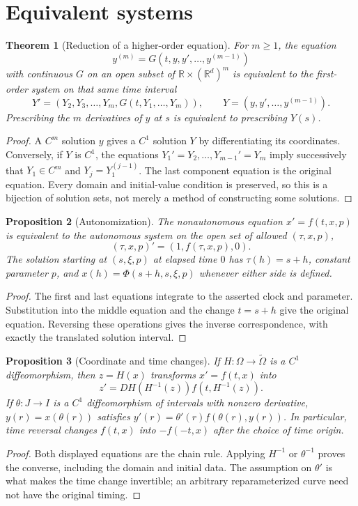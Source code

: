 \documentclass[11pt,oneside]{book}
\newtheorem{theorem}{Theorem}[chapter]
\newtheorem{proposition}[theorem]{Proposition}
\theoremstyle{definition}
\theoremstyle{remark}\newtheorem{remark}[theorem]{Remark}
\newcommand{\R}{\mathbb R}\newcommand{\C}{\mathbb C}
\begin{document}
\section{Equivalent systems}
\begin{theorem}[Reduction of a higher-order equation]\label{d13:01:higher-order}
For $m\geq1$, the equation
\[
 y^{(m)}=G(t,y,y',\ldots,y^{(m-1)})
\]
with continuous $G$ on an open subset of $\R\times(\R^d)^m$ is equivalent
to the first-order system on that same time interval
\[
 Y'=(Y_2,Y_3,\ldots,Y_m,G(t,Y_1,\ldots,Y_m)),
 \qquad Y=(y,y',\ldots,y^{(m-1)}).
\]
Prescribing the $m$ derivatives of $y$ at $s$ is equivalent to prescribing
$Y(s)$.
\end{theorem}
\begin{proof}
A $C^m$ solution $y$ gives a $C^1$ solution $Y$ by differentiating its
coordinates. Conversely, if $Y$ is $C^1$, the equations
$Y_1'=Y_2,\ldots,Y_{m-1}'=Y_m$ imply successively that
$Y_1\in C^m$ and $Y_j=Y_1^{(j-1)}$. The last component equation is the
original equation. Every domain and initial-value condition is preserved,
so this is a bijection of solution sets, not merely a method of constructing
some solutions.
\end{proof}

\begin{proposition}[Autonomization]\label{d13:01:autonomization}
The nonautonomous equation $x'=f(t,x,p)$ is equivalent to the autonomous
system on the open set of allowed $(\tau,x,p)$,
\[
 (\tau,x,p)'=(1,f(\tau,x,p),0).
\]
The solution starting at $(s,\xi,p)$ at elapsed time $0$ has
$\tau(h)=s+h$, constant parameter $p$, and
$x(h)=\Phi(s+h,s,\xi,p)$ whenever either side is defined.
\end{proposition}
\begin{proof}
The first and last equations integrate to the asserted clock and parameter.
Substitution into the middle equation and the change $t=s+h$ give the
original equation. Reversing these operations gives the inverse
correspondence, with exactly the translated solution interval.
\end{proof}

\begin{proposition}[Coordinate and time changes]\label{d13:01:coordinates}
If $H:\Omega\to\widetilde\Omega$ is a $C^1$ diffeomorphism, then
$z=H(x)$ transforms $x'=f(t,x)$ into
\[
 z'=DH(H^{-1}(z))f(t,H^{-1}(z)).
\]
If $\theta:J\to I$ is a $C^1$ diffeomorphism of intervals with nonzero
derivative, $y(r)=x(\theta(r))$ satisfies
$y'(r)=\theta'(r)f(\theta(r),y(r))$. In particular, time reversal changes
$f(t,x)$ into $-f(-t,x)$ after the choice of time origin.
\end{proposition}
\begin{proof}
Both displayed equations are the chain rule. Applying $H^{-1}$ or
$\theta^{-1}$ proves the converse, including the domain and initial data.
The assumption on $\theta'$ is what makes the time change invertible;
an arbitrary reparameterized curve need not have the original timing.
\end{proof}
\end{document}
